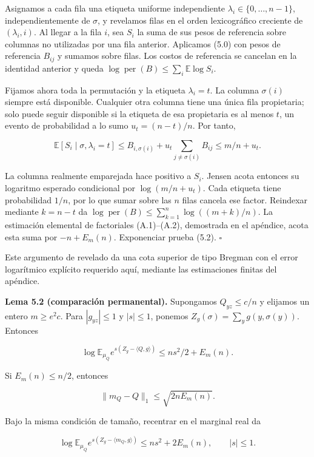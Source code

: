 \documentclass[spanish,11pt,a4paper]{article}
\begin{document}
Asignamos a cada fila una etiqueta uniforme independiente \(\lambda_i\in\{0,\ldots,n-1\}\), independientemente de \(\sigma\), y revelamos filas en el orden lexicográfico creciente de \((\lambda_i,i)\). Al llegar a la fila \(i\), sea \(S_i\) la suma de sus pesos de referencia sobre columnas no utilizadas por una fila anterior. Aplicamos (5.0) con pesos de referencia \(B_{ij}\) y sumamos sobre filas. Los costos de referencia se cancelan en la identidad anterior y queda \(\log\operatorname{per}(B)\le\sum_i\mathbb E\log S_i\).

Fijamos ahora toda la permutación y la etiqueta \(\lambda_i=t\). La columna \(\sigma(i)\) siempre está disponible. Cualquier otra columna tiene una única fila propietaria; solo puede seguir disponible si la etiqueta de esa propietaria es al menos \(t\), un evento de probabilidad a lo sumo \(u_t=(n-t)/n\). Por tanto,

\nopagebreak[4]
\[\mathbb E[S_i\mid\sigma,\lambda_i=t]
\le B_{i,\sigma(i)}+u_t\sum_{j\ne\sigma(i)}B_{ij}
\le m/n+u_t.\tag{5.2a}\]

La columna realmente emparejada hace positivo a \(S_i\). Jensen acota entonces su logaritmo esperado condicional por \(\log(m/n+u_t)\). Cada etiqueta tiene probabilidad \(1/n\), por lo que sumar sobre las \(n\) filas cancela ese factor. Reindexar mediante \(k=n-t\) da \(\log\operatorname{per}(B)\le\sum_{k=1}^n\log((m+k)/n)\). La estimación elemental de factoriales (A.1)--(A.2), demostrada en el apéndice, acota esta suma por \(-n+E_m(n)\). Exponenciar prueba (5.2). \(\square\)

Este argumento de revelado da una cota superior de tipo Bregman con el error logarítmico explícito requerido aquí, mediante las estimaciones finitas del apéndice.

\textbf{Lema 5.2 (comparación permanental).} Supongamos \(Q_{yz}\le c/n\) y elijamos un entero \(m\ge e^2c\). Para \(|g_{yz}|\le1\) y \(|s|\le1\), ponemos \(Z_g(\sigma)=\sum_yg(y,\sigma(y))\). Entonces

\nopagebreak[4]
\[\log\mathbb E_{\mu_Q}e^{s(Z_g-\langle Q,g\rangle)}
\le ns^2/2+E_m(n).\tag{5.3}\]

Si \(E_m(n)\le n/2\), entonces

\nopagebreak[4]
\[\|m_Q-Q\|_1\le\sqrt{2nE_m(n)}.\tag{5.4}\]

Bajo la misma condición de tamaño, recentrar en el marginal real da

\nopagebreak[4]
\[\log\mathbb E_{\mu_Q}e^{s(Z_g-\langle m_Q,g\rangle)}
\le ns^2+2E_m(n),\qquad |s|\le1.\tag{5.5}\]
\end{document}
